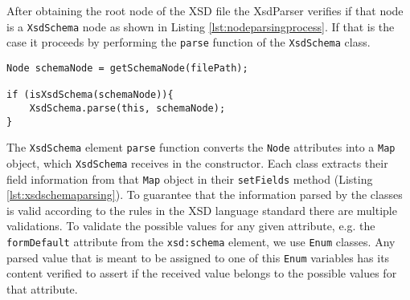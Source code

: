 \newpage

\noindent
After obtaining the root node of the \ac{XSD} file the XsdParser verifies if that node is a \texttt{XsdSchema} node as shown in Listing \ref{lst:nodeparsingprocess}. If that is the case it proceeds by performing the \texttt{parse} function of the \texttt{XsdSchema} class.  

\bigskip


\begin{minipage}{\linewidth}
\begin{lstlisting}[caption={XsdParser Node Parsing Process},captionpos=b,label={lst:nodeparsingprocess}]
Node schemaNode = getSchemaNode(filePath);
            
if (isXsdSchema(schemaNode)){
    XsdSchema.parse(this, schemaNode);
}
\end{lstlisting}
\end{minipage}

\noindent
The \texttt{XsdSchema} element \texttt{parse} function converts the \texttt{Node} attributes into a \texttt{Map} object, which \texttt{XsdSchema} receives in the constructor. Each class extracts their field information from that \texttt{Map} object in their \texttt{setFields} method (Listing \ref{lst:xsdschemaparsing}). To guarantee that the information parsed by the classes is valid according to the rules in the \ac{XSD} language standard there are multiple validations. To validate the possible values for any given attribute, e.g. the \texttt{formDefault} attribute from the \texttt{xsd:schema} element, we use \texttt{Enum} classes. Any parsed value that is meant to be assigned to one of this \texttt{Enum} variables has its content verified to assert if the received value belongs to the possible values for that attribute. 

\bigskip


